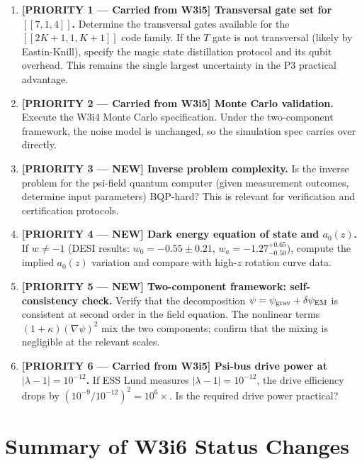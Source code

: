 \documentclass[11pt]{article}
\theoremstyle{definition}
\theoremstyle{remark}
\newcommand{\lamdiff}{|\lambda-1|}
\newcommand{\psigrav}{\psi_{\rm grav}}
\newcommand{\dpsiEM}{\delta\psi_{\rm EM}}
\begin{document}
\begin{enumerate}

\item \textbf{[PRIORITY 1 --- Carried from W3i5] Transversal gate set
  for $[[7,1,4]]$.}
  Determine the transversal gates available for the $[[2K+1,1,K+1]]$
  code family.  If the $T$ gate is not transversal (likely by
  Eastin-Knill), specify the magic state distillation protocol and
  its qubit overhead.  This remains the single largest uncertainty in
  the P3 practical advantage.

\item \textbf{[PRIORITY 2 --- Carried from W3i5] Monte Carlo validation.}
  Execute the W3i4 Monte Carlo specification.  Under the two-component
  framework, the noise model is unchanged, so the simulation spec
  carries over directly.

\item \textbf{[PRIORITY 3 --- NEW] Inverse problem complexity.}
  Is the inverse problem for the psi-field quantum computer
  (given measurement outcomes, determine input parameters) BQP-hard?
  This is relevant for verification and certification protocols.

\item \textbf{[PRIORITY 4 --- NEW] Dark energy equation of state and
  $a_0(z)$.}
  If $w \neq -1$ (DESI results: $w_0 = -0.55 \pm 0.21$,
  $w_a = -1.27^{+0.65}_{-0.50}$), compute the implied $a_0(z)$
  variation and compare with high-$z$ rotation curve data.

\item \textbf{[PRIORITY 5 --- NEW] Two-component framework:
  self-consistency check.}
  Verify that the decomposition $\psi = \psigrav + \dpsiEM$ is
  consistent at second order in the field equation.  The nonlinear
  terms $(1+\kappa)(\nabla\psi)^2$ mix the two components; confirm
  that the mixing is negligible at the relevant scales.

\item \textbf{[PRIORITY 6 --- Carried from W3i5] Psi-bus drive power
  at $\lamdiff = 10^{-12}$.}
  If ESS Lund measures $\lamdiff = 10^{-12}$, the drive efficiency
  drops by $(10^{-9}/10^{-12})^2 = 10^6\times$.  Is the required
  drive power practical?

\end{enumerate}

\section*{Summary of W3i6 Status Changes}
\end{document}
